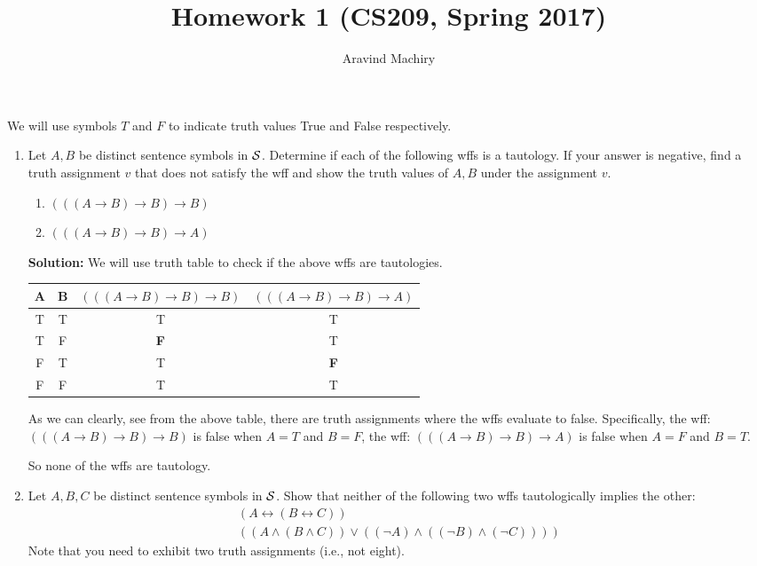 \documentclass[12pt,letterpaper]{article}
\title{\vspace*{-1cm}\Large\bf Homework 1 (CS209, Spring 2017) \vspace*{-5mm}}
\author{\normalsize Aravind Machiry}
\date{\vspace*{-1cm}}
\begin{document}
\maketitle
We will use symbols $T$ and $F$ to indicate truth values True and False respectively.
\thispagestyle{empty}
\begin{enumerate}
\item
  Let $A, B$ be distinct sentence symbols in $\cal S$.
  Determine if each of the following wffs is a tautology.
  If your answer is negative, find a truth assignment $v$
  that does not satisfy the wff and show the truth values of
  $A,B$ under the assignment $v$.
  \begin{enumerate}
  \item $(((A \rightarrow B) \rightarrow B) \rightarrow B)$
  \item $(((A \rightarrow B) \rightarrow B) \rightarrow A)$
  \end{enumerate}
  \textbf{Solution:}
We will use truth table to check if the above wffs are tautologies.  
\begin{center}
\begin{tabular}{ |c|c|c|c| } 
 \hline
 A & B & $(((A \rightarrow B) \rightarrow B) \rightarrow B)$ & $(((A \rightarrow B) \rightarrow B) \rightarrow A)$ \\ 
 \hline
 T & T & T & T \\ 
 T & F & \textbf{F} & T \\ 
 F & T & T & \textbf{F} \\ 
 F & F & T & T \\ 
 \hline
\end{tabular}
\end{center}
As we can clearly, see from the above table, there are truth assignments where the wffs evaluate to false. Specifically, the wff:$(((A \rightarrow B) \rightarrow B) \rightarrow B)$ is false when $A=T$ and $B=F$, the wff: $(((A \rightarrow B) \rightarrow B) \rightarrow A)$ is false when $A=F$ and $B=T$.

So none of the wffs are tautology.
\item
  Let $A, B, C$ be distinct sentence symbols in $\cal S$.
  Show that neither of the following two wffs tautologically
  implies the other:
  $$
  \begin{array}{l}
    (A \leftrightarrow (B \leftrightarrow C))\\
    ((A\land (B\land C)) \lor ((\neg A) \land ((\neg B) \land
    (\neg C))))
  \end{array}
  $$
  Note that you need to exhibit two truth assignments
  (i.e., not eight).


\end{enumerate}
\end{document}
